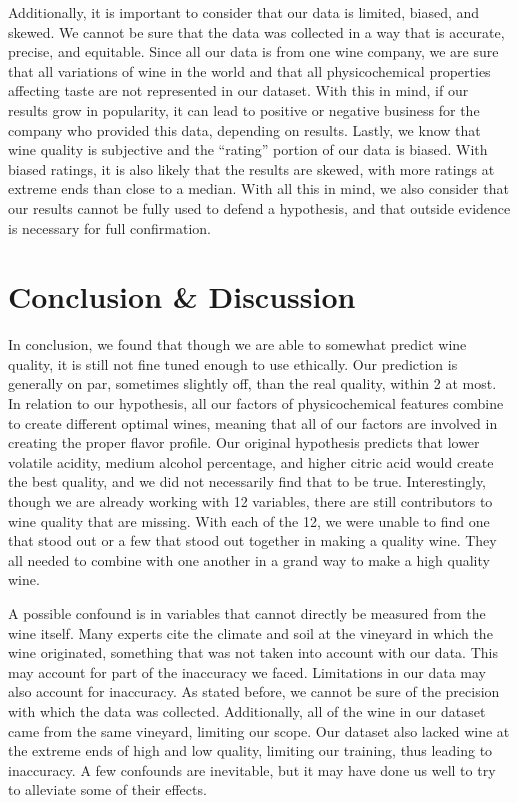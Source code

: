 \documentclass[11pt]{article}
\begin{document}
Additionally, it is important to consider that our data is limited,
biased, and skewed. We cannot be sure that the data was collected in a
way that is accurate, precise, and equitable. Since all our data is from
one wine company, we are sure that all variations of wine in the world
and that all physicochemical properties affecting taste are not
represented in our dataset. With this in mind, if our results grow in
popularity, it can lead to positive or negative business for the company
who provided this data, depending on results. Lastly, we know that wine
quality is subjective and the ``rating'' portion of our data is biased.
With biased ratings, it is also likely that the results are skewed, with
more ratings at extreme ends than close to a median. With all this in
mind, we also consider that our results cannot be fully used to defend a
hypothesis, and that outside evidence is necessary for full
confirmation.

    \section{Conclusion \& Discussion}\label{conclusion-discussion}

    In conclusion, we found that though we are able to somewhat predict wine
quality, it is still not fine tuned enough to use ethically. Our
prediction is generally on par, sometimes slightly off, than the real
quality, within 2 at most. In relation to our hypothesis, all our
factors of physicochemical features combine to create different optimal
wines, meaning that all of our factors are involved in creating the
proper flavor profile. Our original hypothesis predicts that lower
volatile acidity, medium alcohol percentage, and higher citric acid
would create the best quality, and we did not necessarily find that to
be true. Interestingly, though we are already working with 12 variables,
there are still contributors to wine quality that are missing. With each
of the 12, we were unable to find one that stood out or a few that stood
out together in making a quality wine. They all needed to combine with
one another in a grand way to make a high quality wine.

A possible confound is in variables that cannot directly be measured
from the wine itself. Many experts cite the climate and soil at the
vineyard in which the wine originated, something that was not taken into
account with our data. This may account for part of the inaccuracy we
faced. Limitations in our data may also account for inaccuracy. As
stated before, we cannot be sure of the precision with which the data
was collected. Additionally, all of the wine in our dataset came from
the same vineyard, limiting our scope. Our dataset also lacked wine at
the extreme ends of high and low quality, limiting our training, thus
leading to inaccuracy. A few confounds are inevitable, but it may have
done us well to try to alleviate some of their effects.
\end{document}
